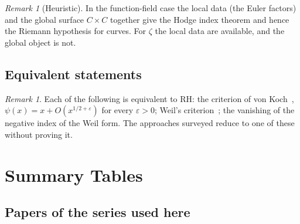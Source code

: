 \documentclass[11pt]{amsart}
\theoremstyle{definition}
\theoremstyle{remark}
\newtheorem{remark}[theorem]{Remark}
\newcommand{\eps}{\varepsilon}
\begin{document}
\begin{remark}[Heuristic]
In the function-field case the local data (the Euler factors) and the global surface
$C\times C$ together give the Hodge index theorem and hence the Riemann hypothesis for
curves. For $\zeta$ the local data are available, and the global object is not.
\end{remark}

\subsection{Equivalent statements}

\begin{remark}
Each of the following is equivalent to RH: the criterion of von Koch~\cite{vK01},
$\psi(x)=x+O(x^{1/2+\eps})$ for every $\eps>0$; Weil's criterion~\cite{Weil52}; the vanishing of
the negative index of the Weil form. The approaches surveyed reduce to one of these
without proving it.
\end{remark}

\section{Summary Tables}
\label{sec:tables}

\subsection{Papers of the series used here}
\end{document}
